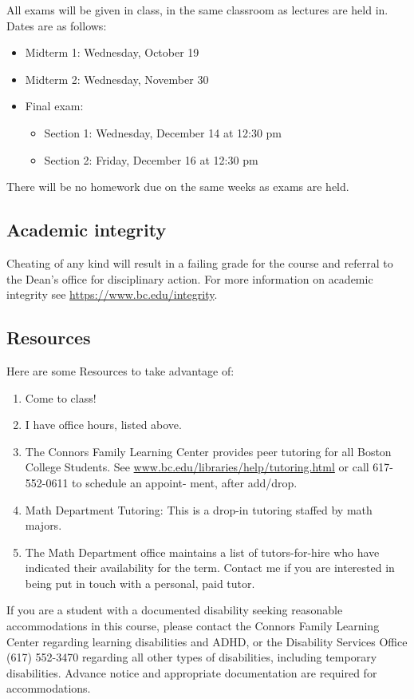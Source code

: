 \documentclass[11pt,oneside]{amsart}
\begin{document}
All exams will be given in class, in the same classroom as lectures are held in. Dates are as follows:
\begin{itemize}
    \item Midterm 1: Wednesday, October 19
    \item Midterm 2: Wednesday, November 30
    \item Final exam:
    \begin{itemize}
        \item Section 1: Wednesday, December 14 at 12:30 pm
        \item Section 2: Friday, December 16 at 12:30 pm
    \end{itemize}
\end{itemize}
There will be no homework due on the same weeks as exams are held.

\subsection*{Academic integrity}
Cheating of any kind will result in a failing grade for the course and referral to the Dean’s office for disciplinary action.  For more information on academic integrity see \url{https://www.bc.edu/integrity}.

\subsection*{Resources}
Here are some Resources to take advantage of:
\begin{enumerate}
    \item Come to class!
    \item I have office hours, listed above.
    \item The Connors Family Learning Center provides peer tutoring for all Boston College Students. See \url{www.bc.edu/libraries/help/tutoring.html} or call 617-552-0611 to schedule an appoint-
ment, after add/drop.
    \item Math Department Tutoring: This is a drop-in tutoring staffed by math majors.
    \item The Math Department office maintains a list of tutors-for-hire who have indicated their
availability for the term. Contact me if you are interested in being put in touch with a
personal, paid tutor.
\end{enumerate}
If you are a student with a documented disability seeking reasonable accommodations in this
course, please contact the Connors Family Learning Center regarding learning disabilities and
ADHD, or the Disability Services Office (617) 552-3470 regarding all other types of disabilities,
including temporary disabilities. Advance notice and appropriate documentation are required for
accommodations.
\end{document}
